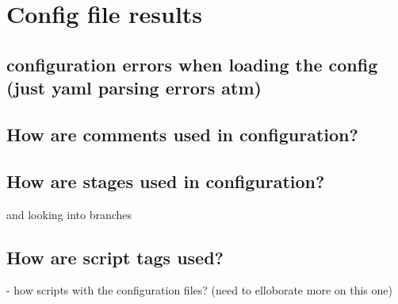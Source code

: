 \documentclass[twoside,12pt,titlepage,a4paper]{article}
\begin{document}
\section{Config file results}

\vspace*{-0.05in}
\subsection{configuration errors when loading the config (just yaml parsing errors atm)}
\vspace*{-0.05in}






\vspace*{-0.05in}
\subsection{How are comments used in configuration?}
\vspace*{-0.05in}

\vspace*{-0.05in}
\subsection{How are stages used in configuration?}
\vspace*{-0.05in}

and looking into branches

\vspace*{-0.05in}
\subsection{How are script tags used?}
\vspace*{-0.05in}

- how scripts with the configuration files? (need to elloborate more on this one)
\end{document}
